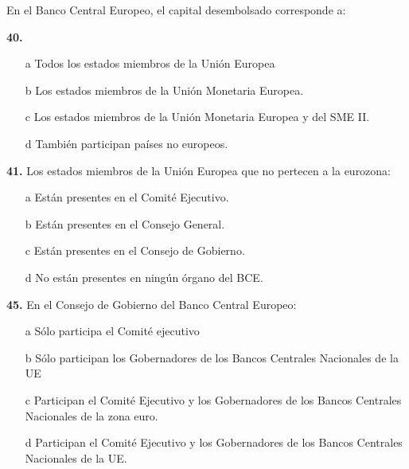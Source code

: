 \documentclass{nuevotema}
\begin{document}
 En el Banco Central Europeo, el capital desembolsado corresponde a:

\textbf{40.}
\begin{enumerate}
	\item[a] Todos los estados miembros de la Unión Europea
	\item[b] Los estados miembros de la Unión Monetaria Europea.
	\item[c] Los estados miembros de la Unión Monetaria Europea y del SME II.
	\item[d] También participan países no europeos.
\end{enumerate}

\textbf{41.} Los estados miembros de la Unión Europea que no pertecen a la eurozona:
\begin{enumerate}
	\item[a] Están presentes en el Comité Ejecutivo.
	\item[b] Están presentes en el Consejo General.
	\item[c] Están presentes en el Consejo de Gobierno.
	\item[d] No están presentes en ningún órgano del BCE.
\end{enumerate}


\textbf{45.} En el Consejo de Gobierno del Banco Central Europeo:
\begin{enumerate}
	\item[a] Sólo participa el Comité ejecutivo
	\item[b] Sólo participan los Gobernadores de los Bancos Centrales Nacionales de la UE
	\item[c] Participan el Comité Ejecutivo y los Gobernadores de los Bancos Centrales Nacionales de la zona euro.
	\item[d] Participan el Comité Ejecutivo y los Gobernadores de los Bancos Centrales Nacionales de la UE.
\end{enumerate}

\end{document}
